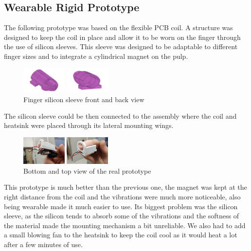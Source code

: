 \subsection{Wearable Rigid Prototype}
The following prototype was based on the flexible PCB coil. A structure was designed to keep the coil in place and allow it to be worn on the finger through the use of silicon sleeves.
This sleeve was designed to be adaptable to different finger sizes and to integrate a cylindrical magnet on the pulp.
\begin{figure}[H]
    \centering
    \begin{subcaptiongroup}
        \centering
        \parbox[b]{0.2\textwidth}{
            \centering
            \includegraphics[width=0.2\textwidth]{Figures/silicon_sleeve_front.png}
        }
        \parbox[b]{0.2\textwidth}{
            \centering
            \includegraphics[width=0.2\textwidth]{Figures/silicon_sleeve_back.png}        
        }
    \end{subcaptiongroup}
    \caption{Finger silicon sleeve front and back view}
\end{figure}
The silicon sleeve could be then connected to the assembly where the coil and heatsink were placed through its lateral mounting wings.
\begin{figure}[H]
    \centering
    \begin{subcaptiongroup}
        \centering
        \parbox[b]{0.2\textwidth}{
            \centering
            \includegraphics[width=0.2\textwidth]{Figures/rigid_prot_btm.png}
        }
        \parbox[b]{0.2\textwidth}{
            \centering
            \includegraphics[width=0.2\textwidth]{Figures/rigid_prot_top.png}
        }
    \end{subcaptiongroup}
    \caption{Bottom and top view of the real prototype}
\end{figure}
This prototype is much better than the previous one, the magnet was kept at the right distance from the coil and the vibrations were much more noticeable, also being wearable made it much easier to use.
Its biggest problem was the silicon sleeve, as the silicon tends to absorb some of the vibrations and the softness of the material made the mounting mechanism a bit unreliable.  
We also had to add a small blowing fan to the heatsink to keep the coil cool as it would heat a lot after a few minutes of use.

